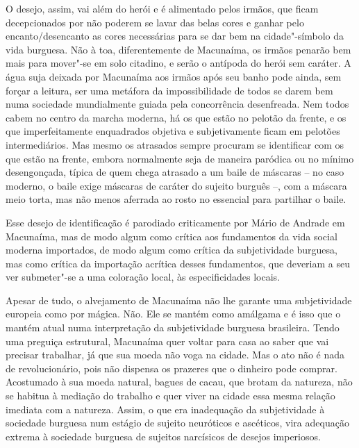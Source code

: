 O desejo, assim, vai além do herói e é alimentado pelos irmãos, que
ficam decepcionados por não poderem se lavar das belas cores e ganhar
pelo encanto/desencanto as cores necessárias para se dar bem na
cidade"-símbolo da vida burguesa. Não à toa, diferentemente de Macunaíma,
os irmãos penarão bem mais para mover"-se em solo citadino, e serão o
antípoda do herói sem caráter. A água suja deixada por Macunaíma aos
irmãos após seu banho pode ainda, sem forçar a leitura, ser uma metáfora
da impossibilidade de todos se darem bem numa sociedade mundialmente
guiada pela concorrência desenfreada. Nem todos cabem no centro da
marcha moderna, há os que estão no pelotão da frente, e os que
imperfeitamente enquadrados objetiva e subjetivamente ficam em pelotões
intermediários. Mas mesmo os atrasados sempre procuram se identificar
com os que estão na frente, embora normalmente seja de maneira paródica
ou no mínimo desengonçada, típica de quem chega atrasado a um baile de
máscaras -- no caso moderno, o baile exige máscaras de caráter do
sujeito burguês --, com a máscara meio torta, mas não menos aferrada ao
rosto no essencial para partilhar o baile.

Esse desejo de identificação é parodiado criticamente por Mário de
Andrade em Macunaíma, mas de modo algum como crítica aos fundamentos da
vida social moderna importados, de modo algum como crítica da
subjetividade burguesa, mas como crítica da importação acrítica desses
fundamentos, que deveriam a seu ver submeter"-se a uma coloração local,
às especificidades locais.

Apesar de tudo, o alvejamento de Macunaíma não lhe garante uma
subjetividade europeia como por mágica. Não. Ele se mantém como amálgama
e é isso que o mantém atual numa interpretação da subjetividade burguesa
brasileira. Tendo uma preguiça estrutural, Macunaíma quer voltar para
casa ao saber que vai precisar trabalhar, já que sua moeda não voga na
cidade. Mas o ato não é nada de revolucionário, pois não dispensa os
prazeres que o dinheiro pode comprar. Acostumado à sua moeda natural,
bagues de cacau, que brotam da natureza, não se habitua à mediação do
trabalho e quer viver na cidade essa mesma relação imediata com a
natureza. Assim, o que era inadequação da subjetividade à sociedade
burguesa num estágio de sujeito neuróticos e ascéticos, vira adequação
extrema à sociedade burguesa de sujeitos narcísicos de desejos
imperiosos.

